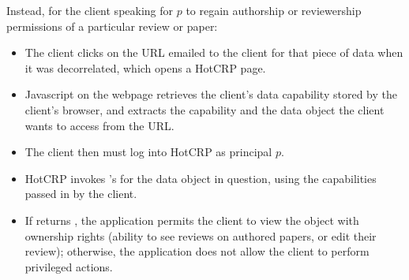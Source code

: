 Instead, for the client speaking for $p$ to regain authorship or reviewership permissions of a
particular review or paper:
\begin{itemize}
    \item The client clicks on the URL emailed to the client for that piece of data when it was decorrelated, which
        opens a HotCRP page.
    \item Javascript on the webpage retrieves the client's data capability
        stored by the client's browser, and extracts the  capability and the data object the client
        wants to access from the URL.
    \item The client then must log into HotCRP as principal $p$.
    \item HotCRP invokes \sys's  for the data object in question,
        using the capabilities passed in by the client.
    \item If \sys returns , the application permits the client to view the object with ownership
        rights (\eg ability to see reviews on authored papers, or edit their review); otherwise, the
        application does not allow the client to perform privileged actions.
\end{itemize}
\fi
